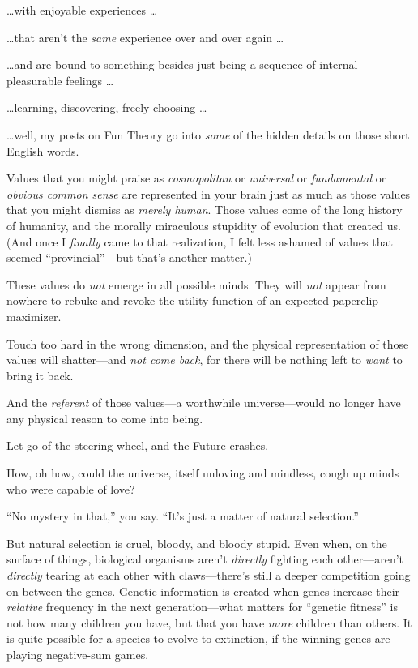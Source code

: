 {
 \ldots with enjoyable experiences \ldots}

{
 \ldots that aren't the \textit{same} experience
over and over again \ldots}

{
 \ldots and are bound to something besides just being a sequence of
internal pleasurable feelings \ldots}

{
 \ldots learning, discovering, freely choosing \ldots}

{
 \ldots well, my posts on Fun Theory go into \textit{some} of the
hidden details on those short English words.}

{
 Values that you might praise as \textit{cosmopolitan} or
\textit{universal} or \textit{fundamental} or \textit{obvious common
sense} are represented in your brain just as much as those values that
you might dismiss as \textit{merely human}. Those values come of the
long history of humanity, and the morally miraculous stupidity of
evolution that created us. (And once I \textit{finally} came to that
realization, I felt less ashamed of values that seemed
``provincial''---but
that's another matter.)}

{
 These values do \textit{not} emerge in all possible minds. They
will \textit{not} appear from nowhere to rebuke and revoke the utility
function of an expected paperclip maximizer.}

{
 Touch too hard in the wrong dimension, and the physical
representation of those values will shatter---and \textit{not come
back}, for there will be nothing left to \textit{want} to bring it
back.}

{
 And the \textit{referent} of those values---a worthwhile
universe---would no longer have any physical reason to come into
being.}

{
 Let go of the steering wheel, and the Future crashes.}

\myendsectiontext


{
 How, oh how, could the universe, itself unloving and mindless,
cough up minds who were capable of love? }

{
 ``No mystery in that,'' you
say. ``It's just a matter of natural
selection.''}

{
 But natural selection is cruel, bloody, and bloody stupid. Even
when, on the surface of things, biological organisms
aren't \textit{directly} fighting each
other---aren't \textit{directly} tearing at each other
with claws---there's still a deeper competition going
on between the genes. Genetic information is created when genes
increase their \textit{relative} frequency in the next
generation---what matters for ``genetic
fitness'' is not how many children you have, but that
you have \textit{more} children than others. It is quite possible for a
species to evolve to extinction, if the winning genes are playing
negative-sum games.}

